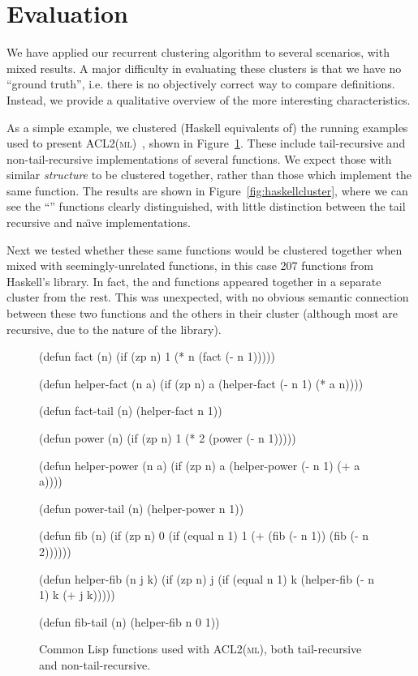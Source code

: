 \section{Evaluation}
\label{sec:evaluation}

\iffalse
TODO: Alison: Next chapter? It's good to lead into the next chapter at the end
of the previous ones.
\fi

We have applied our recurrent clustering algorithm to several scenarios, with
mixed results. A major difficulty in evaluating these clusters is that we have
no ``ground truth'', i.e. there is no objectively correct way to compare
definitions. Instead, we provide a qualitative overview of the more interesting
characteristics.

As a simple example, we clustered (Haskell equivalents of) the running examples
used to present \textsc{ACL2(ml)}~\cite{heras2013proof}, shown in
Figure~\ref{fig:lisp}. These include tail-recursive and non-tail-recursive
implementations of several functions. We expect those with similar
\emph{structure} to be clustered together, rather than those which implement the
same function. The results are shown in Figure~\ref{fig:haskellcluster}, where
we can see the ``'' functions clearly distinguished, with little
distinction between the tail recursive and na\"{\i}ve implementations.

Next we tested whether these same functions would be clustered together when
mixed with seemingly-unrelated functions, in this case 207 functions from
Haskell's  library. In fact, the  and 
functions appeared together in a separate cluster from the rest. This was
unexpected, with no obvious semantic connection between these two functions and
the others in their cluster (although most are recursive, due to the nature of
the  library).

\begin{figure}
  \begin{common-lisp}
(defun fact (n)
  (if (zp n) 1 (* n (fact (- n 1)))))

(defun helper-fact (n a)
  (if (zp n) a (helper-fact (- n 1) (* a n))))

(defun fact-tail (n)
  (helper-fact n 1))

(defun power (n)
  (if (zp n) 1 (* 2 (power (- n 1)))))

(defun helper-power (n a)
  (if (zp n) a (helper-power (- n 1) (+ a a))))

(defun power-tail (n)
  (helper-power n 1))

(defun fib (n)
  (if (zp n)
      0
      (if (equal n 1)
          1
          (+ (fib (- n 1)) (fib (- n 2))))))

(defun helper-fib (n j k)
  (if (zp n)
      j
      (if (equal n 1)
          k
          (helper-fib (- n 1) k (+ j k)))))

(defun fib-tail (n)
  (helper-fib n 0 1))
  \end{common-lisp}
  \caption{Common Lisp functions used with \textsc{ACL2(ml)}, both
    tail-recursive and non-tail-recursive.}
  \label{fig:lisp}
\end{figure}


